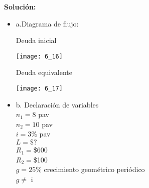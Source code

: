 	\textbf{Solución:}\\
	\begin{itemize}
		\item a.Diagrama de flujo:\\
		\begin{center}
			Deuda inicial\\
		\end{center}
		\begin{center}
			\texttt{[image: 6\_16]}
		\end{center}
		\begin{center}
			Deuda equivalente\\
		\end{center}
		\begin{center}
			\texttt{[image: 6\_17]}
		\end{center}
		\item b. Declaración de variables\\
			$n_{1} = 8$ pav\\
			$n_{2} = 10$ pav\\
			$i = 3$\% pav\\
			$L = \$?$\\
			$R_{1} = $\$600\\
			$R_{2} = $\$100\\
			$g = 25$\% crecimiento geométrico periódico\\
			$g \not=$ i\\
		

\end{itemize}
